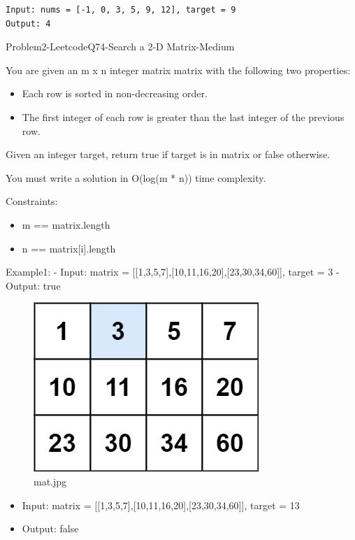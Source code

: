 \documentclass[11pt]{article}
\providecommand{\tightlist}{%
      \setlength{\itemsep}{0pt}\setlength{\parskip}{0pt}}
\begin{document}
    \begin{Verbatim}[commandchars=\\\{\}]
Input: nums = [-1, 0, 3, 5, 9, 12], target = 9
Output: 4
    \end{Verbatim}

    Problem2-LeetcodeQ74-Search a 2-D Matrix-Medium

You are given an m x n integer matrix matrix with the following two
properties:

\begin{itemize}
\tightlist
\item
  Each row is sorted in non-decreasing order.
\item
  The first integer of each row is greater than the last integer of the
  previous row.
\end{itemize}

Given an integer target, return true if target is in matrix or false
otherwise.

You must write a solution in O(log(m * n)) time complexity.

Constraints:

\begin{itemize}
\tightlist
\item
  m == matrix.length
\item
  n == matrix{[}i{]}.length
\end{itemize}

Example1: - Input: matrix =
{[}{[}1,3,5,7{]},{[}10,11,16,20{]},{[}23,30,34,60{]}{]}, target = 3 -
Output: true

\begin{figure}
\centering
\includegraphics{d53fa452-c215-42f2-b450-86b22bc062d0.jpg}
\caption{mat.jpg}
\end{figure}

\begin{itemize}
\tightlist
\item
  Input: matrix =
  {[}{[}1,3,5,7{]},{[}10,11,16,20{]},{[}23,30,34,60{]}{]}, target = 13
\item
  Output: false
\end{itemize}
\end{document}
